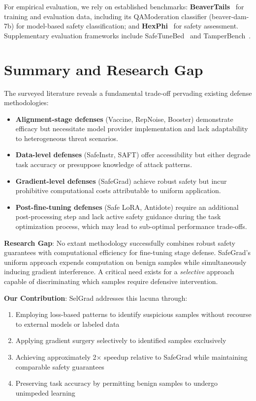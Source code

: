For empirical evaluation, we rely on established benchmarks: \textbf{BeaverTails}~\cite{ji2024beavertails} for training and evaluation data, including its QAModeration classifier (beaver-dam-7b) for model-based safety classification; and \textbf{HexPhi}~\cite{qi2023hexphi} for safety assessment. Supplementary evaluation frameworks include SafeTuneBed~\cite{anonymous2025safetunebed} and TamperBench~\cite{anonymous2025tamperbench}.

\section{Summary and Research Gap}
\label{sec:research_gap}

The surveyed literature reveals a fundamental trade-off pervading existing defense methodologies:

\begin{itemize}
    \item \textbf{Alignment-stage defenses} (Vaccine, RepNoise, Booster) demonstrate efficacy but necessitate model provider implementation and lack adaptability to heterogeneous threat scenarios.

    \item \textbf{Data-level defenses} (SafeInstr, SAFT) offer accessibility but either degrade task accuracy or presuppose knowledge of attack patterns.

    \item \textbf{Gradient-level defenses} (SafeGrad) achieve robust safety but incur prohibitive computational costs attributable to uniform application.

    \item \textbf{Post-fine-tuning defenses} (Safe LoRA, Antidote) require an additional post-processing step and lack active safety guidance during the task optimization process, which may lead to sub-optimal performance trade-offs.
\end{itemize}

\textbf{Research Gap}: No extant methodology successfully combines robust safety guarantees with computational efficiency for fine-tuning stage defense. SafeGrad's uniform approach expends computation on benign samples while simultaneously inducing gradient interference. A critical need exists for a \textit{selective} approach capable of discriminating which samples require defensive intervention.

\textbf{Our Contribution}: SelGrad addresses this lacuna through:
\begin{enumerate}
    \item Employing loss-based patterns to identify suspicious samples without recourse to external models or labeled data
    \item Applying gradient surgery selectively to identified samples exclusively
    \item Achieving approximately 2$\times$ speedup relative to SafeGrad while maintaining comparable safety guarantees
    \item Preserving task accuracy by permitting benign samples to undergo unimpeded learning
\end{enumerate}


